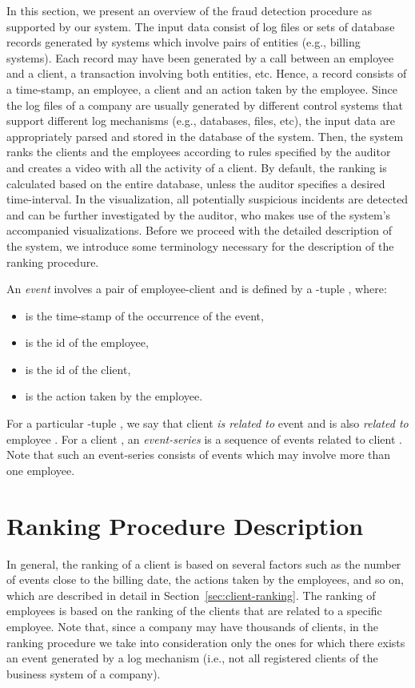 \documentclass[conference]{IEEEtran}
\begin{document}
In this section, we present an overview of the fraud detection
procedure as supported by our system. The input data consist of log
files or sets of database records generated by systems which involve
pairs of entities (e.g., billing systems). Each record may have been
generated by a call between an employee and a client, a transaction
involving both entities, etc. Hence, a record consists of a
time-stamp, an employee, a client and an action taken by the
employee. Since the log files of a company are usually generated by
different control systems that support different log mechanisms
(e.g., databases, files, etc), the input data are appropriately
parsed and stored in the database of the system. Then, the system
ranks the clients and the employees according to rules specified by
the auditor and creates a video with all the activity of a client.
By default, the ranking is calculated based on the entire database,
unless the auditor specifies a desired time-interval. In the
visualization, all potentially suspicious incidents are detected and
can be further investigated by the auditor, who makes use of the
system's accompanied visualizations. Before we proceed with the
detailed description of the system, we introduce some terminology
necessary for the description of the ranking procedure.

An \emph{event}  involves a pair of employee-client and is
defined by a -tuple , where:
\begin{itemize}
  \item  is the time-stamp of the occurrence of the event,
  \item  is the id of the employee,
  \item  is the id of the client,
  \item  is the action taken by the employee.
\end{itemize}
For a particular -tuple , we say that client 
\emph{is related to} event  and is also \emph{related to}
employee . For a client , an \emph{event-series}  is a sequence of events
 related to client . Note that such an
event-series consists of events which may involve more than one
employee.


\section{Ranking Procedure Description}
\label{sec:ranking}

In general, the ranking of a client is based on several factors such
as the number of events close to the billing date, the actions taken
by the employees, and so on, which are described in detail in
Section~\ref{sec:client-ranking}. The ranking of employees is based
on the ranking of the clients that are related to a specific
employee. Note that, since a company may have thousands of clients,
in the ranking procedure we take into consideration only the ones
for which there exists an event generated by a log mechanism (i.e.,
not all registered clients of the business system of a company).
\end{document}
